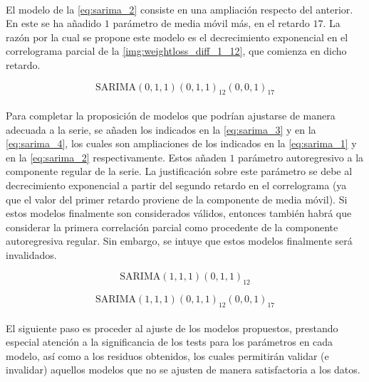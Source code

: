 \documentclass[a4paper, spanish]{article}
\begin{document}
      \paragraph{}
      El modelo de la \autoref{eq:sarima_2} consiste en una ampliación respecto del anterior. En este se ha añadido $1$ parámetro de media móvil más, en el retardo $17$. La razón por la cual se propone este modelo es el decrecimiento exponencial en el correlograma parcial de la \autoref{img:weightloss_diff_1_12}, que comienza en dicho retardo.

      \begin{equation}
        \label{eq:sarima_2}
        \text{SARIMA}(0, 1, 1)(0, 1, 1)_{12}(0, 0, 1)_{17}
      \end{equation}

      \paragraph{}
      Para completar la proposición de modelos que podrían ajustarse de manera adecuada a la serie, se añaden los indicados en la \autoref{eq:sarima_3} y en la \autoref{eq:sarima_4}, los cuales son ampliaciones de los indicados en la \autoref{eq:sarima_1} y en la \autoref{eq:sarima_2} respectivamente. Estos añaden $1$ parámetro autoregresivo a la componente regular de la serie. La justificación sobre este parámetro se debe al decrecimiento exponencial a partir del segundo retardo en el correlograma (ya que el valor del primer retardo proviene de la componente de media móvil). Si estos modelos finalmente son considerados válidos, entonces también habrá que considerar la primera correlación parcial como procedente de la componente autoregresiva regular. Sin embargo, se intuye que estos modelos finalmente será invalidados.

      \begin{equation}
        \label{eq:sarima_3}
        \text{SARIMA}(1, 1, 1)(0, 1, 1)_{12}
      \end{equation}

      \begin{equation}
        \label{eq:sarima_4}
        \text{SARIMA}(1, 1, 1)(0, 1, 1)_{12}(0, 0, 1)_{17}
      \end{equation}

      \paragraph{}
      El siguiente paso es proceder al ajuste de los modelos propuestos, prestando especial atención a la significancia de los tests para los parámetros en cada modelo, así como a los residuos obtenidos, los cuales permitirán validar (e invalidar) aquellos modelos que no se ajusten de manera satisfactoria a los datos.
\end{document}
